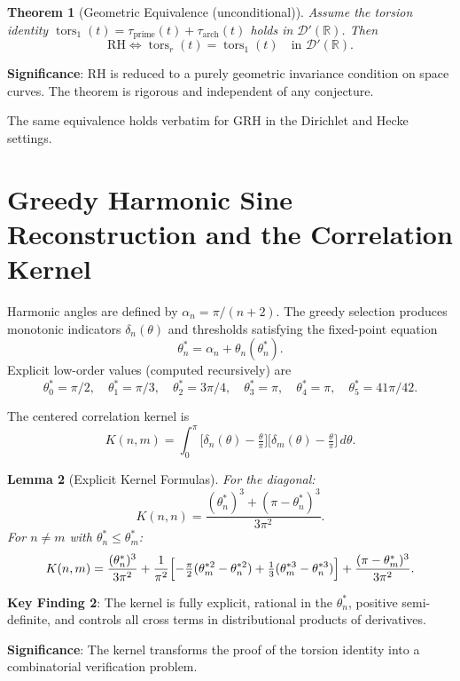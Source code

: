 \documentclass[11pt,a4paper]{article}
\newtheorem{theorem}{Theorem}[section]
\newtheorem{lemma}[theorem]{Lemma}
\begin{document}
\begin{theorem}[Geometric Equivalence (unconditional)]
Assume the torsion identity \(\operatorname{tors}_1(t) = \tau_{\mathrm{prime}}(t) + \tau_{\mathrm{arch}}(t)\) holds in \(\mathcal{D}'(\mathbb{R})\). Then
\[
\mathrm{RH} \iff \operatorname{tors}_r(t) = \operatorname{tors}_1(t) \quad \text{in } \mathcal{D}'(\mathbb{R}).
\]
\end{theorem}

\textbf{Significance}: RH is reduced to a purely geometric invariance condition on space curves. The theorem is rigorous and independent of any conjecture.

The same equivalence holds verbatim for GRH in the Dirichlet and Hecke settings.

\section{Greedy Harmonic Sine Reconstruction and the Correlation Kernel}

Harmonic angles are defined by \(\alpha_n = \pi/(n+2)\). The greedy selection produces monotonic indicators \(\delta_n(\theta)\) and thresholds satisfying the fixed-point equation
\[
\theta_n^* = \alpha_n + \theta_n(\theta_n^*).
\]
Explicit low-order values (computed recursively) are
\[
\theta_0^* = \pi/2,\quad \theta_1^* = \pi/3,\quad \theta_2^* = 3\pi/4,\quad \theta_3^* = \pi,\quad \theta_4^* = \pi,\quad \theta_5^* = 41\pi/42.
\]

The centered correlation kernel is
\[
K(n,m) = \int_0^\pi \bigl[ \delta_n(\theta) - \tfrac{\theta}{\pi} \bigr] \bigl[ \delta_m(\theta) - \tfrac{\theta}{\pi} \bigr] \, d\theta.
\]

\begin{lemma}[Explicit Kernel Formulas]
For the diagonal:
\[
K(n,n) = \frac{(\theta_n^*)^3 + (\pi - \theta_n^*)^3}{3\pi^2}.
\]
For \(n \neq m\) with \(\theta_n^* \le \theta_m^*\):
\[
K(n,m) = \frac{(\theta_n^*)^3}{3\pi^2} + \frac{1}{\pi^2}\Bigl[-\tfrac{\pi}{2}(\theta_m^{*2}-\theta_n^{*2}) + \tfrac{1}{3}(\theta_m^{*3}-\theta_n^{*3})\Bigr] + \frac{(\pi-\theta_m^*)^3}{3\pi^2}.
\]
\end{lemma}

\textbf{Key Finding 2}: The kernel is fully explicit, rational in the \(\theta_n^*\), positive semi-definite, and controls all cross terms in distributional products of derivatives.

\textbf{Significance}: The kernel transforms the proof of the torsion identity into a combinatorial verification problem.
\end{document}
